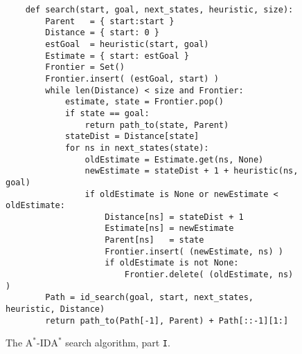 \begin{figure}[!ht]
\centering
\begin{verbatim}
    def search(start, goal, next_states, heuristic, size):
        Parent   = { start:start }
        Distance = { start: 0 }           
        estGoal  = heuristic(start, goal)
        Estimate = { start: estGoal }
        Frontier = Set()
        Frontier.insert( (estGoal, start) )
        while len(Distance) < size and Frontier:
            estimate, state = Frontier.pop()
            if state == goal:
                return path_to(state, Parent)
            stateDist = Distance[state]
            for ns in next_states(state):
                oldEstimate = Estimate.get(ns, None)
                newEstimate = stateDist + 1 + heuristic(ns, goal)
                if oldEstimate is None or newEstimate < oldEstimate:
                    Distance[ns] = stateDist + 1
                    Estimate[ns] = newEstimate
                    Parent[ns]   = state
                    Frontier.insert( (newEstimate, ns) )
                    if oldEstimate is not None:
                        Frontier.delete( (oldEstimate, ns) )
        Path = id_search(goal, start, next_states, heuristic, Distance)
        return path_to(Path[-1], Parent) + Path[::-1][1:]
\end{verbatim}
\vspace*{-0.3cm}
\caption{The $\mathrm{A}^*$-$\mathrm{IDA}^*$ search algorithm, part \texttt{I}.}
\label{fig:A-Star-Ida-Star.ipynb-1}
\end{figure}

